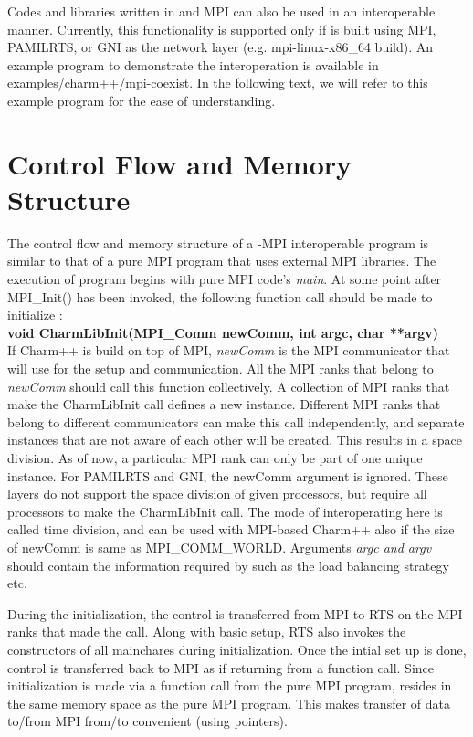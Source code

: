 Codes and libraries written in \charmpp{} and MPI can also be used in an
interoperable manner.  Currently, this functionality is supported only if
\charmpp{} is built using MPI, PAMILRTS, or GNI as the network layer (e.g.
mpi-linux-x86\_64 build).  An example program to demonstrate the interoperation
is available in examples/charm++/mpi-coexist. In the following text, we will
refer to this example program for the ease of understanding.

\section{Control Flow and Memory Structure}
The control flow and memory structure of a \charmpp{}-MPI interoperable program  is
similar to that of a pure MPI program that uses external MPI libraries. The
execution of program begins with pure MPI code's {\em main}. At some point after
MPI\_Init() has been invoked, the following function call should be made to initialize
\charmpp{}: \\

{\bf void CharmLibInit(MPI\_Comm newComm, int argc, char **argv)}\\

\noindent If Charm++ is build on top of MPI, {\em newComm} is the MPI
communicator that \charmpp{} will use for the setup and communication. All the
MPI ranks that belong to {\em newComm} should call this function collectively.  A collection of
MPI ranks that make the CharmLibInit call defines a new \charmpp{} instance.
Different MPI ranks that belong to different communicators can make this call
independently, and separate \charmpp{} instances that are not aware of each
other will be created. This results in a space division. As of now, a particular MPI
rank can only be part of one unique \charmpp{} instance. For PAMILRTS and GNI,
the newComm argument is ignored. These layers do not support the space division
of given processors, but require all processors to make the CharmLibInit call.
The mode of interoperating here is called time division, and can be used with
MPI-based Charm++ also if the size of newComm is same as MPI\_COMM\_WORLD.
Arguments {\em argc and argv} should contain the information required by
\charmpp{} such as the load balancing strategy etc.

During the initialization, the control is transferred from MPI to \charmpp{}
RTS on the MPI ranks that made the call. Along with basic setup, \charmpp{} RTS also invokes
the constructors of all mainchares during initialization. Once the intial set up
is done, control is transferred back to MPI as if returning from a function call.
Since \charmpp{} initialization is made via a function call from the pure MPI
program, \charmpp{} resides in the same memory space as the pure MPI program. This
makes transfer of data to/from MPI from/to \charmpp{} convenient (using pointers).

